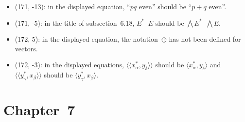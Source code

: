 \documentclass[letterpaper,12pt]{article}
\newcommand{\dsum}{\oplus}
\newcommand{\stprod}{\mathop{\widehat{\otimes}}}
\newcommand{\bigeprod}{\bigwedge}
\newcommand{\sprod}[2]{\langle#1,#2\rangle}
\newcommand{\ssprod}[2]{\langle\!\langle#1,#2\rangle\!\rangle}
\begin{document}
\begin{itemize}
\item (171, -13): in the displayed equation, ``\(pq\) even'' should be ``\(p+q\) even''.
\item (171, -5): in the title of subsection~6.18, \(E^*\stprod E\) should be \(\bigeprod E^*\stprod\bigeprod E\).
\item (172, 5): in the displayed equation, the notation~\(\dsum\) has not been defined for vectors.
\item (172, -3): in the displayed equations, \(\ssprod{x^*_{\alpha}}{y_{\delta}}\) should be \(\sprod{x^*_{\alpha}}{y_{\delta}}\) and \(\ssprod{y^*_{\gamma}}{x_{\beta}}\) should be \(\sprod{y^*_{\gamma}}{x_{\beta}}\).
\end{itemize}

\section*{Chapter~7}
\end{document}
